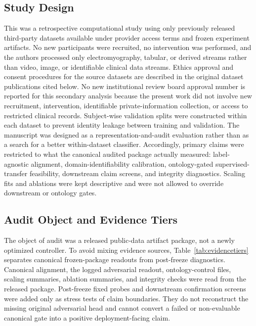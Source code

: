 \documentclass[journal]{IEEEtran}
\begin{document}
\subsection{Study Design}
This was a retrospective computational study using only previously released third-party datasets available under provider access terms and frozen experiment artifacts. No new participants were recruited, no intervention was performed, and the authors processed only electromyography, tabular, or derived streams rather than video, image, or identifiable clinical data streams. Ethics approval and consent procedures for the source datasets are described in the original dataset publications cited below. No new institutional review board approval number is reported for this secondary analysis because the present work did not involve new recruitment, intervention, identifiable private-information collection, or access to restricted clinical records. Subject-wise validation splits were constructed within each dataset to prevent identity leakage between training and validation. The manuscript was designed as a representation-and-audit evaluation rather than as a search for a better within-dataset classifier. Accordingly, primary claims were restricted to what the canonical audited package actually measured: label-agnostic alignment, domain-identifiability calibration, ontology-gated supervised-transfer feasibility, downstream claim screens, and integrity diagnostics. Scaling fits and ablations were kept descriptive and were not allowed to override downstream or ontology gates.

\subsection{Audit Object and Evidence Tiers}
The object of audit was a released public-data artifact package, not a newly optimized controller. To avoid mixing evidence sources, Table~\ref{tab:evidencetiers} separates canonical frozen-package readouts from post-freeze diagnostics. Canonical alignment, the logged adversarial readout, ontology-control files, scaling summaries, ablation summaries, and integrity checks were read from the released package. Post-freeze fixed probes and downstream confirmation screens were added only as stress tests of claim boundaries. They do not reconstruct the missing original adversarial head and cannot convert a failed or non-evaluable canonical gate into a positive deployment-facing claim.
\end{document}
